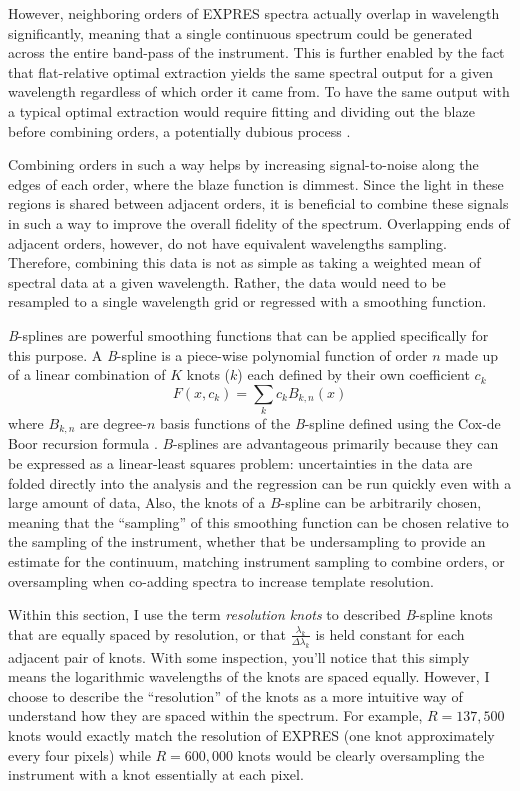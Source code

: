 However, neighboring orders of EXPRES spectra actually overlap in wavelength significantly, meaning that a single continuous spectrum could be generated across the entire band-pass of the instrument. This is further enabled by the fact that flat-relative optimal extraction yields the same spectral output for a given wavelength regardless of which order it came from. To have the same output with a typical optimal extraction would require fitting and dividing out the blaze before combining orders, a potentially dubious process \citep{xu_modeling_2019}.

Combining orders in such a way helps by increasing signal-to-noise along the edges of each order, where the blaze function is dimmest. Since the light in these regions is shared between adjacent orders, it is beneficial to combine these signals in such a way to improve the overall fidelity of the spectrum. Overlapping ends of adjacent orders, however, do not have equivalent wavelengths sampling. Therefore, combining this data is not as simple as taking a weighted mean of spectral data at a given wavelength. Rather, the data would need to be resampled to a single wavelength grid \citep{anglada-escude_harps-terra_2012} or regressed with a smoothing function.

\textit{B}-splines \citep{de_boor_practical_1978, dierckx_curve_1995, eilers_flexible_1996} are powerful smoothing functions that can be applied specifically for this purpose. A \textit{B}-spline is a piece-wise polynomial function of order $n$ made up of a linear combination of $K$ knots ($k$) each defined by their own coefficient $c_k$
\begin{equation}
    F(x,{c_k}) = \sum_k {c_k B_{k,n}(x)}
\end{equation}
where $B_{k,n}$ are degree-$n$ basis functions of the \textit{B}-spline defined using the Cox-de Boor recursion formula \citep{de_boor_practical_1978}. $B$-splines are advantageous primarily because they can be expressed as a linear-least squares problem: uncertainties in the data are folded directly into the analysis and the regression can be run quickly even with a large amount of data, Also, the knots of a $B$-spline can be arbitrarily chosen, meaning that the ``sampling'' of this smoothing function can be chosen relative to the sampling of the instrument, whether that be undersampling to provide an estimate for the continuum, matching instrument sampling to combine orders, or oversampling when co-adding spectra to increase template resolution.

Within this section, I use the term \textit{resolution knots} to described \textit{B}-spline knots that are equally spaced by resolution, or that $\frac{\lambda_k}{\Delta \lambda_k}$ is held constant for each adjacent pair of knots. With some inspection, you'll notice that this simply means the logarithmic wavelengths of the knots are spaced equally. However, I choose to describe the ``resolution'' of the knots as a more intuitive way of understand how they are spaced within the spectrum. For example, $R=137,500$ knots would exactly match the resolution of EXPRES (one knot approximately every four pixels) while $R=600,000$ knots would be clearly oversampling the instrument with a knot essentially at each pixel.

